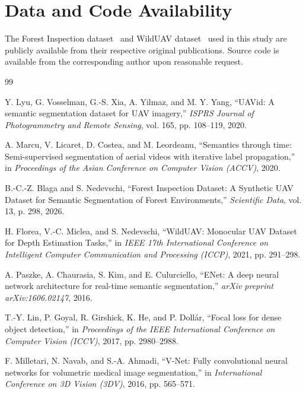 \documentclass[journal,compsoc]{IEEEtran}
\begin{document}
\section*{Data and Code Availability}
The Forest Inspection dataset~\cite{forestdataset} and WildUAV dataset~\cite{florea2021wilduav} used in this study are publicly available from their respective original publications. Source code is available from the corresponding author upon reasonable request.

\begin{thebibliography}{99}

Y. Lyu, G. Vosselman, G.-S. Xia, A. Yilmaz, and M. Y. Yang, ``UAVid: A semantic segmentation dataset for UAV imagery,'' \textit{ISPRS Journal of Photogrammetry and Remote Sensing}, vol. 165, pp. 108--119, 2020.

A. Marcu, V. Licaret, D. Costea, and M. Leordeanu, ``Semantics through time: Semi-supervised segmentation of aerial videos with iterative label propagation,'' in \textit{Proceedings of the Asian Conference on Computer Vision (ACCV)}, 2020.

B.-C.-Z. Blaga and S. Nedevschi, ``Forest Inspection Dataset: A Synthetic UAV Dataset for Semantic Segmentation of Forest Environments,'' \textit{Scientific Data}, vol. 13, p. 298, 2026.

H. Florea, V.-C. Miclea, and S. Nedevschi, ``WildUAV: Monocular UAV Dataset for Depth Estimation Tasks,'' in \textit{IEEE 17th International Conference on Intelligent Computer Communication and Processing (ICCP)}, 2021, pp. 291--298.

A. Paszke, A. Chaurasia, S. Kim, and E. Culurciello, ``ENet: A deep neural network architecture for real-time semantic segmentation,'' \textit{arXiv preprint arXiv:1606.02147}, 2016.

T.-Y. Lin, P. Goyal, R. Girshick, K. He, and P. Doll{\'a}r, ``Focal loss for dense object detection,'' in \textit{Proceedings of the IEEE International Conference on Computer Vision (ICCV)}, 2017, pp. 2980--2988.

F. Milletari, N. Navab, and S.-A. Ahmadi, ``V-Net: Fully convolutional neural networks for volumetric medical image segmentation,'' in \textit{International Conference on 3D Vision (3DV)}, 2016, pp. 565--571.


\end{thebibliography}
\end{document}
